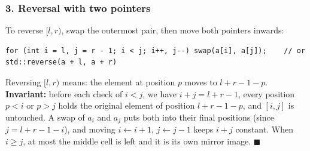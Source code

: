 \subsubsection*{3. Reversal with two pointers}

To reverse $[l, r)$, swap the outermost pair, then move both pointers inwards:
\begin{lstlisting}[style=snippet]
for (int i = l, j = r - 1; i < j; i++, j--) swap(a[i], a[j]);    // or std::reverse(a + l, a + r)
\end{lstlisting}

\begin{diagrambox}
\end{diagrambox}

\begin{invariantbox}
Reversing $[l, r)$ means: the element at position $p$ moves to $l + r - 1 - p$. \textbf{Invariant:} before each check of $i < j$, we have $i + j = l + r - 1$, every position $p < i$ or $p > j$ holds the original element of position $l + r - 1 - p$, and $[i, j]$ is untouched. A swap of $a_i$ and $a_j$ puts both into their final positions (since $j = l + r - 1 - i$), and moving $i \gets i + 1$, $j \gets j - 1$ keeps $i + j$ constant. When $i \ge j$, at most the middle cell is left and it is its own mirror image. \hfill$\blacksquare$
\end{invariantbox}

